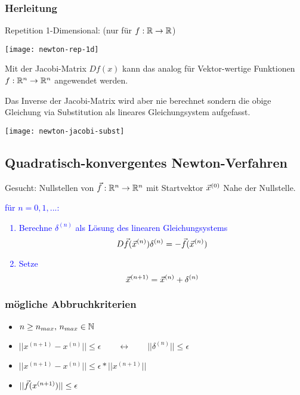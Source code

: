 \subsubsection{Herleitung}

Repetition 1-Dimensional: (nur für $f: \mathbb{R} \to \mathbb{R}$)

\texttt{[image: newton-rep-1d]}


Mit der Jacobi-Matrix $Df(x)$ kann das analog für Vektor-wertige
Funktionen $f: \mathbb{R}^n \to \mathbb{R}^n$ angewendet werden.

\begin{center}
\end{center}


Das Inverse der Jacobi-Matrix wird aber nie berechnet sondern die obige Gleichung
via Substitution als lineares Gleichungsystem aufgefasst.

\texttt{[image: newton-jacobi-subst]}





\subsection{Quadratisch-konvergentes Newton-Verfahren}

Gesucht: Nullstellen von $\vec f : \mathbb{R}^n \to \mathbb{R}^n$ mit Startvektor $\vec x^{(0)}$
Nahe der Nullstelle.

\textcolor{blue}{
	\Large{
		für $n = 0, 1,...$:
		\begin{enumerate}
			\item Berechne $\delta^{(n)}$ als Lösung des linearen Gleichungsystems
			      $$ D\vec{f}(\vec x^{(n)}) \delta^{(n)} = - \vec f(\vec x^{(n)}) $$
			\item Setze
			      $$ \vec x^{(n+1)} = \vec x^{(n)} + \delta^{(n)} $$
		\end{enumerate}
	}
}

\subsubsection{mögliche Abbruchkriterien}

\begin{itemize}
    \item $n \ge n_{max}, \, n_{max} \in \mathbb{N}$
    \item $|| x^{(n+1)} - x^{(n)} || \le \epsilon 
        \qquad \leftrightarrow \qquad || \delta^{(n)} || \le \epsilon$
    \item $|| x^{(n+1)} - x^{(n)} || \le \epsilon * || x^{(n+1)} ||$
    \item $|| \vec f(x^{(n+1)}) || \le \epsilon$
\end{itemize}



